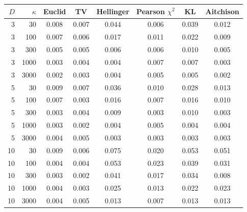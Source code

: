 \begin{tabular}{rrcccccc}\toprule
$D$ & $\kappa$ & Euclid & TV & Hellinger & Pearson $\chi^2$ & KL & Aitchison\\\midrule
3 & 30 & 0.008 & 0.007 & 0.044 & 0.006 & 0.039 & 0.012\\
3 & 100 & 0.007 & 0.006 & 0.017 & 0.011 & 0.022 & 0.009\\
3 & 300 & 0.005 & 0.005 & 0.006 & 0.006 & 0.010 & 0.005\\
3 & 1000 & 0.003 & 0.004 & 0.004 & 0.007 & 0.007 & 0.003\\
3 & 3000 & 0.002 & 0.003 & 0.004 & 0.005 & 0.005 & 0.002\\
5 & 30 & 0.009 & 0.007 & 0.036 & 0.010 & 0.028 & 0.013\\
5 & 100 & 0.007 & 0.003 & 0.016 & 0.007 & 0.016 & 0.010\\
5 & 300 & 0.003 & 0.004 & 0.009 & 0.003 & 0.010 & 0.003\\
5 & 1000 & 0.003 & 0.002 & 0.004 & 0.005 & 0.004 & 0.004\\
5 & 3000 & 0.004 & 0.005 & 0.003 & 0.003 & 0.003 & 0.003\\
10 & 30 & 0.009 & 0.006 & 0.075 & 0.020 & 0.053 & 0.051\\
10 & 100 & 0.004 & 0.004 & 0.053 & 0.023 & 0.039 & 0.031\\
10 & 300 & 0.003 & 0.002 & 0.041 & 0.017 & 0.034 & 0.008\\
10 & 1000 & 0.004 & 0.003 & 0.025 & 0.013 & 0.022 & 0.023\\
10 & 3000 & 0.004 & 0.005 & 0.013 & 0.007 & 0.013 & 0.013\\
\bottomrule\end{tabular}
